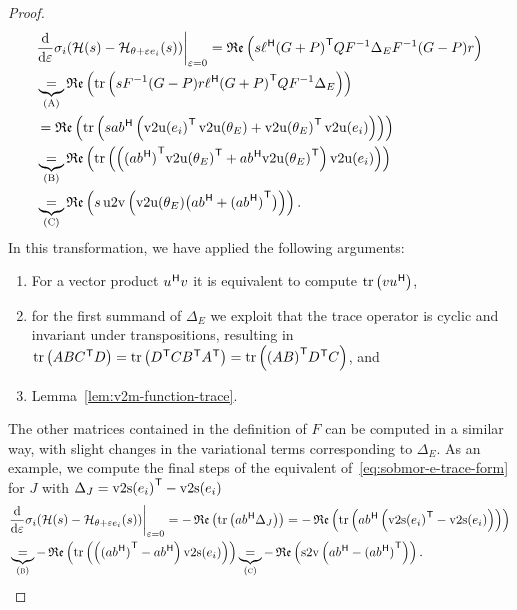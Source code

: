 \begin{proof}
\begin{equation}
\begin{aligned}
            &\res{\frac{\dif}{\dif \varepsilon} \sigma_i(\mcl{H}(s) - \mcl{H}_{\theta + \varepsilon e_i}(s))}{\varepsilon = 0} = \re{s \ell\herm {(G + P)}\trans Q F\inv \Delta_E F\inv (G - P) r} \\
             &\underbrace{=}_{(\msc{A})} \re{\trace{s F\inv (G - P) r \ell\herm {(G + P)}\trans Q F\inv \Delta_E}} \\
             &= \re{\trace{s a b\herm \left( {\vecupper(e_i)}\trans \vecupper(\theta_E) + {\vecupper(\theta_E)}\trans \vecupper(e_i) \right)}} \\
             &\underbrace{=}_{(\msc{B})} \re{\trace{\left( {(a b\herm)}\trans {\vecupper(\theta_E)}\trans + a b\herm {\vecupper(\theta_E)}\trans \right) \vecupper(e_i)}} \\
             &\underbrace{=}_{(\msc{C})} \re{s \uppervec\left( \vecupper(\theta_E) \bigl( a b\herm + {(a b\herm)}\trans \bigr) \right)}.
        \end{aligned}
    \end{equation}
    In this transformation, we have applied the following arguments:
    \begin{enumerate}[label= (\scshape{\alph*}):]
        \item For a vector product $u^{\mkern1mu \mathsf{H}} v$ it is equivalent to compute $\mathop{}\!\mathrm{tr}\left(v u^{\mkern1mu \mathsf{H}}\right)$,
        \item for the first summand of $\Delta_E$ we exploit that the trace operator is cyclic and invariant under transpositions, resulting in $\mathop{}\!\mathrm{tr}\left(A B C^{\mkern1mu \mathsf{T}} D\right) = \mathop{}\!\mathrm{tr}\left(D^{\mkern1mu \mathsf{T}} C B^{\mkern1mu \mathsf{T}} A^{\mkern1mu \mathsf{T}}\right) = \mathop{}\!\mathrm{tr}\left({(A B)}^{\mkern1mu \mathsf{T}} D^{\mkern1mu \mathsf{T}} C\right)$, and
        \item Lemma~\ref{lem:v2m-function-trace}.
    \end{enumerate}
    The other matrices contained in the definition of $F$ can be computed in a similar way, with slight changes in the variational terms corresponding to $\Delta_E$.
    As an example, we compute the final steps of the equivalent of~\eqref{eq:sobmor-e-trace-form} for $J$ with $\Delta_J = {\mathop{}\!\mathrm{v}2\mathrm{s}(e_i)}^{\mkern1mu \mathsf{T}} - \mathop{}\!\mathrm{v}2\mathrm{s}(e_i)$
    \begin{equation*}
        \begin{aligned}
            &\res{\frac{\dif}{\dif \varepsilon} \sigma_i(\mcl{H}(s) - \mcl{H}_{\theta + \varepsilon e_i}(s))}{\varepsilon = 0} = - \re{\trace{a b\herm \Delta_J}} = - \re{\trace{a b\herm \left({\vecstrict(e_i)}\trans - \vecstrict(e_i)\right)}} \\
             &\underbrace{=}_{(\msc{b})} - \re{\trace{\left( {(a b\herm)}\trans - a b\herm \right) \vecstrict(e_i)}} \underbrace{=}_{(\msc{c})} - \re{\strictvec\left( a b\herm - {(a b\herm)}\trans \right)}.
        \end{aligned}
    \end{equation*}


\end{proof}
